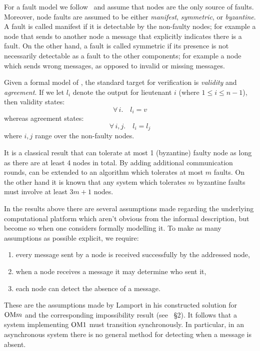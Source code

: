 For a fault model we follow~\cite{Rushby-OM1} and assume that nodes are the
only source of faults. Moreover, node faults are assumed to be either
\emph{manifest}, \emph{symmetric}, or \emph{byzantine}. A fault is called manifest if
it is detectable by the non-faulty nodes; for example a node that sends to
another node a message that explicitly indicates there is a fault. On the
other hand, a fault is called symmetric if its presence is not necessarily
detectable as a fault to the other components; for example a node which sends
wrong messages, as opposed to invalid or missing messages.

Given a formal model of , the standard target for verification is
\emph{validity} and \emph{agreement}. If we let $l_i$ denote the output for
lieutenant $i$ (where $1 \le i \le n-1$), then validity states:
%
\begin{equation}
    \forall \,i. \quad l_i = v
\end{equation}
%
whereas agreement states:
%
\begin{equation}
    \forall \,i, j. \quad l_i = l_j
\end{equation}
%
where $i,j$ range over the non-faulty nodes.

It is a classical result that  can tolerate at most 1 (byzantine) faulty
node as long as there are at least 4 nodes in total. By adding additional
communication rounds,  can be extended to an algorithm  which
tolerates at most $m$ faults. On the other hand it is known that any system
which tolerates $m$ byzantine faults must involve at least $3m+1$ nodes.

In the results above there are several assumptions made regarding the
underlying computational platform which aren't obvious from the informal
description, but become so when one considers formally modelling it. To make
as many assumptions as possible explicit, we require:
\begin{enumerate}
    \item every message sent by a node is received successfully by the
        addressed node,
    \item when a node receives a message it may determine who sent it,
    \item each node can detect the absence of a message.
\end{enumerate}
These are the assumptions made by Lamport in his constructed solution for
$\mathrm{OM}{m}$ and the corresponding impossibility result (see
\cite{Lamport-OM}~\S2). It follows that a system implementing $\mathrm{OM}{1}$ must
transition synchronously. In particular, in an asynchronous system there is no
general method for detecting when a message is absent.


